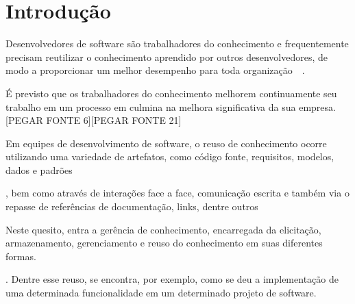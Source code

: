 \chapter{Introdução}



Desenvolvedores de software são trabalhadores do conhecimento e frequentemente precisam reutilizar o conhecimento aprendido por outros desenvolvedores, de modo a proporcionar um melhor desempenho para toda organização~\cite{Druker1993}~\cite{Wiig2003}.
É previsto que os trabalhadores do conhecimento melhorem  continuamente seu trabalho em um processo em culmina na melhora significativa da sua empresa. [PEGAR FONTE 6][PEGAR FONTE 21]
Em equipes de desenvolvimento de software, o reuso de conhecimento ocorre utilizando uma variedade de artefatos, como código fonte, requisitos, modelos, dados e padrões~\cite{Levy2009}, bem como através de interações face a face, comunicação escrita e também via o repasse de referências de documentação, links, dentre outros~\cite{Storey2014}~\cite{Olson2000}~\cite{CubraniC2004}

Neste quesito, entra a gerência de conhecimento, encarregada da elicitação, armazenamento, gerenciamento e reuso do conhecimento em suas diferentes formas.
.
Dentre esse reuso, se encontra, por exemplo, como se deu a implementação de uma determinada funcionalidade em um determinado projeto de software.

